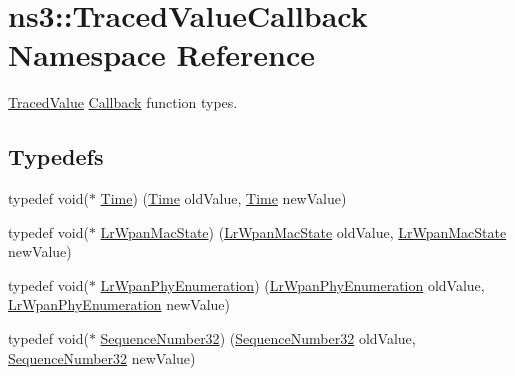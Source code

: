 \hypertarget{namespacens3_1_1TracedValueCallback}{}\section{ns3\+:\+:Traced\+Value\+Callback Namespace Reference}
\label{namespacens3_1_1TracedValueCallback}


\hyperlink{classns3_1_1TracedValue}{Traced\+Value} \hyperlink{classns3_1_1Callback}{Callback} function types.  


\subsection*{Typedefs}
\begin{DoxyCompactItemize}
\item 
typedef void($\ast$ \hyperlink{namespacens3_1_1TracedValueCallback_a7ffd3e7c142ffe7c8a1d2db9b8de38ec}{Time}) (\hyperlink{classns3_1_1Time}{Time} old\+Value, \hyperlink{classns3_1_1Time}{Time} new\+Value)
\item 
typedef void($\ast$ \hyperlink{group__lr-wpan_gab113a3a2c9eb8193a72835890954f1db}{Lr\+Wpan\+Mac\+State}) (\hyperlink{group__lr-wpan_ga02ee7efd682937a8781f5e6101f61884}{Lr\+Wpan\+Mac\+State} old\+Value, \hyperlink{group__lr-wpan_ga02ee7efd682937a8781f5e6101f61884}{Lr\+Wpan\+Mac\+State} new\+Value)
\item 
typedef void($\ast$ \hyperlink{group__lr-wpan_ga83e29cd3a6a828f93f66faedbd978113}{Lr\+Wpan\+Phy\+Enumeration}) (\hyperlink{group__lr-wpan_ga6494269d13d45c511a07b7ccbb1de754}{Lr\+Wpan\+Phy\+Enumeration} old\+Value, \hyperlink{group__lr-wpan_ga6494269d13d45c511a07b7ccbb1de754}{Lr\+Wpan\+Phy\+Enumeration} new\+Value)
\item 
typedef void($\ast$ \hyperlink{group__network_ga27972028fff053ee0921314701d0df61}{Sequence\+Number32}) (\hyperlink{group__network_gacb2070e4e98d2d5135c9bede58f07a03}{Sequence\+Number32} old\+Value, \hyperlink{group__network_gacb2070e4e98d2d5135c9bede58f07a03}{Sequence\+Number32} new\+Value)
\end{DoxyCompactItemize}
